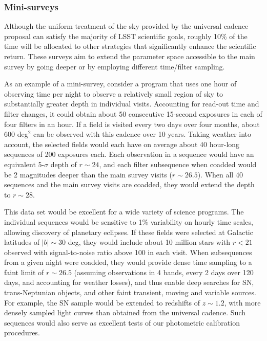 \documentclass{emulateapj}
\begin{document}
\subsubsection{ Mini-surveys}
\label{Sec:minisurveys}

Although the uniform treatment of the sky provided by the universal cadence
proposal can satisfy the majority of LSST scientific goals, roughly 10\%
of the time will be allocated to other strategies that significantly enhance the 
scientific return.  These surveys aim to extend the parameter space accessible 
to the main survey by going deeper or by employing different time/filter
sampling. 

As an example of a mini-survey, consider a program that uses one hour of
observing time per night to observe a relatively small region of sky to
substantially greater depth in individual visits. Accounting for
read-out time and filter changes, it could obtain about 50 consecutive
15-second exposures in each of four filters in an hour. If a field is visited
every two days over four months, about 600 deg$^2$ can be observed with this 
cadence over 10 years. Taking weather into account, the selected fields would 
each have on average about 40 hour-long sequences of 200 exposures each. Each 
observation in a sequence would have an equivalent 5-$\sigma$ depth of
$r\sim24$, and each filter subsequence when coadded would be 2 magnitudes 
deeper than the main survey visits ($r\sim26.5$). When all 40 sequences and 
the main survey visits are coadded, they would extend the depth to $r\sim28$. 

This data set would be excellent for a wide variety of science programs. The 
individual sequences would be sensitive to 1\% variability on hourly time 
scales, allowing discovery of planetary eclipses. If these fields were selected 
at Galactic latitudes of $|b|\sim30$ deg, they would include about 10 million 
stars with $r<21$ observed with signal-to-noise ratio above 100 in each visit.
When subsequences from a given night were coadded, they would 
provide dense time sampling to a faint limit of $r\sim26.5$ (assuming observations
in 4 bands, every 2 days over 120 days, and accounting for weather losses), and thus 
enable deep searches 
for SN, trans-Neptunian objects, and other faint transient, moving and 
variable sources.  For example, the SN sample
would be extended to redshifts of $z\sim1.2$, with more densely sampled light
curves than obtained from the universal cadence. Such sequences would also
serve as excellent tests of our photometric calibration procedures. 
\end{document}
